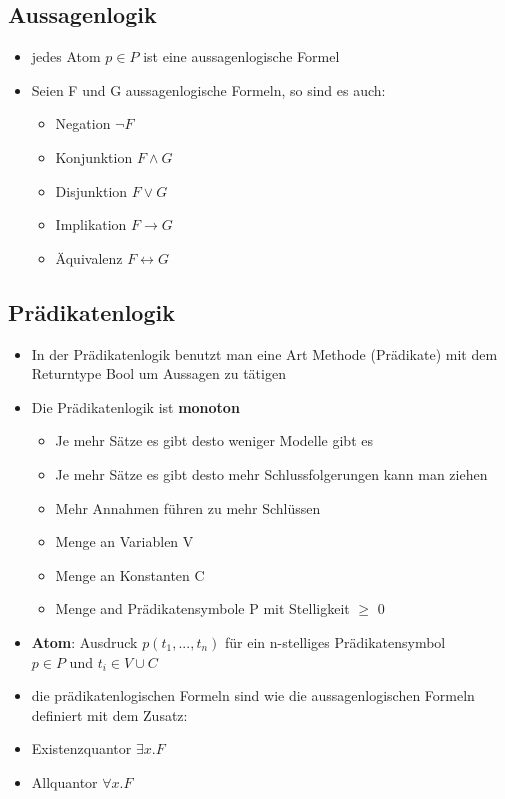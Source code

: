 \documentclass[12pt,a4paper]{article}
\begin{document}
\subsection{Aussagenlogik}
\begin{itemize}
\item jedes Atom $p \in P$ ist eine aussagenlogische Formel
\item Seien F und G aussagenlogische Formeln, so sind es auch:
\begin{itemize}
\item Negation $\neg F$
\item Konjunktion $ F \land G $
\item Disjunktion $ F \lor G $
\item Implikation $ F \rightarrow G$
\item Äquivalenz $ F \leftrightarrow G $
\end{itemize}
\end{itemize}

\subsection{Prädikatenlogik}
\begin{itemize}
\item In der Prädikatenlogik benutzt man eine Art Methode (Prädikate) mit dem Returntype Bool um Aussagen zu tätigen
\item Die Prädikatenlogik ist \textbf{monoton}
\begin{itemize}
\item Je mehr Sätze es gibt desto weniger Modelle gibt es
\item Je mehr Sätze es gibt desto mehr Schlussfolgerungen kann man ziehen
\item Mehr Annahmen führen zu mehr Schlüssen
\end{itemize}
\begin{itemize}
\item Menge an Variablen V
\item Menge an Konstanten C
\item Menge and Prädikatensymbole P mit Stelligkeit $\geq$ 0
\end{itemize}
\item \textbf{Atom}: Ausdruck $p(t_1,...,t_n)$ für ein n-stelliges Prädikatensymbol\\
$p\in P$ und $t_i \in V \cup C$
\item die prädikatenlogischen Formeln sind wie die aussagenlogischen Formeln definiert mit dem Zusatz:
\item Existenzquantor $\exists x.F$
\item Allquantor $\forall x.F$
\end{itemize}
\end{document}
